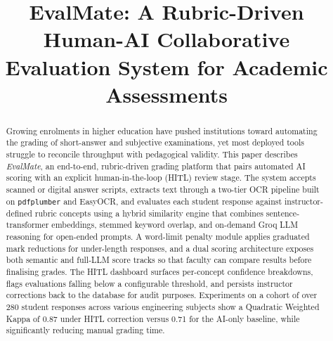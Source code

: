 \documentclass[conference]{IEEEtran}
\begin{document}
\title{EvalMate: A Rubric-Driven Human-AI Collaborative\\
       Evaluation System for Academic Assessments}

\author{%
  \and
}

\maketitle

\begin{abstract}
Growing enrolments in higher education have pushed institutions
toward automating the grading of short-answer and subjective
examinations, yet most deployed tools struggle to reconcile
throughput with pedagogical validity. This paper describes
\textit{EvalMate}, an end-to-end, rubric-driven grading platform
that pairs automated AI scoring with an explicit human-in-the-loop
(HITL) review stage. The system accepts scanned or digital answer
scripts, extracts text through a two-tier OCR pipeline built on
\texttt{pdfplumber} and EasyOCR, and evaluates each student
response against instructor-defined rubric concepts using a hybrid
similarity engine that combines sentence-transformer embeddings,
stemmed keyword overlap, and on-demand Groq LLM reasoning for
open-ended prompts. A word-limit penalty module applies graduated
mark reductions for under-length responses, and a dual scoring
architecture exposes both semantic and full-LLM score tracks so
that faculty can compare results before finalising grades. The HITL
dashboard surfaces per-concept confidence breakdowns, flags
evaluations falling below a configurable threshold, and persists
instructor corrections back to the database for audit purposes.
Experiments on a cohort of over 280 student responses across
various engineering subjects show a Quadratic Weighted Kappa
of 0.87 under HITL correction versus 0.71 for the AI-only
baseline, while significantly reducing manual grading time.
\end{abstract}
\end{document}
